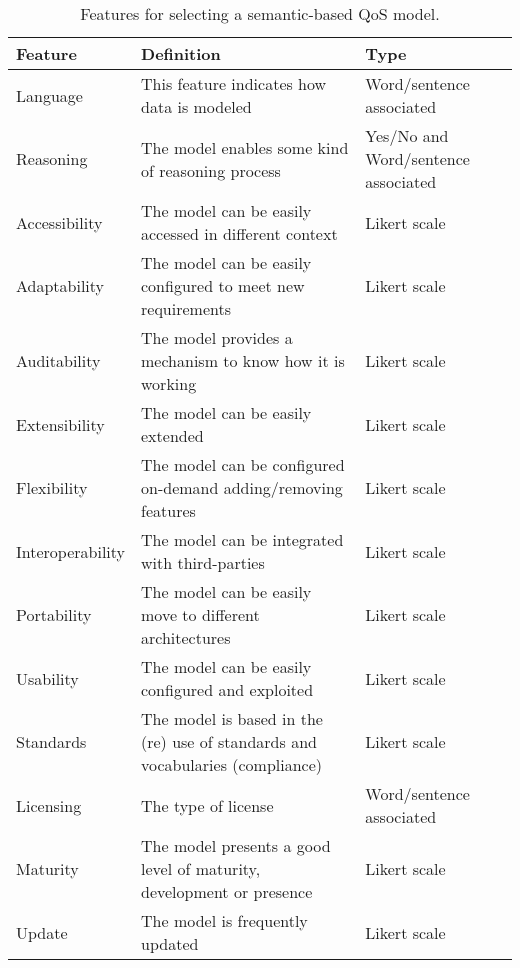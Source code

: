 \begin{table}[!ht]
\renewcommand{\arraystretch}{1.3}
\tiny
\begin{center}
\begin{tabular}[c]{|p{2.5cm}|p{5cm}|p{3cm}|} 
\hline
  \textbf{Feature} &  \textbf{Definition}  &  \textbf{Type} \\\hline
  Language & This feature indicates how data is modeled & Word/sentence associated \\ \hline
  Reasoning & The model enables some kind of reasoning process & Yes/No and Word/sentence associated  \\ \hline
  Accessibility & The model can be easily accessed in different context & Likert scale  \\ \hline
  Adaptability & The model can be easily configured to meet new requirements & Likert scale  \\ \hline
  Auditability & The model provides a mechanism to know how it is working & Likert scale  \\ \hline
  Extensibility & The model can be easily extended & Likert scale  \\ \hline
  Flexibility & The model can be configured on-demand adding/removing features & Likert scale  \\ \hline  
  Interoperability & The model can be integrated with third-parties  & Likert scale  \\ \hline
  Portability & The model can be easily move to different architectures & Likert scale  \\ \hline
  Usability & The model can be easily configured and exploited & Likert scale  \\ \hline
  Standards & The model is based in the (re) use of standards and vocabularies (compliance) & Likert scale\ \\ \hline
  Licensing & The type of license & Word/sentence associated \\ \hline
  Maturity & The model presents a good level of maturity, development or presence & Likert scale\\ \hline
  Update & The model is frequently updated & Likert scale\\ \hline
\hline
\end{tabular}
\caption{Features for selecting a semantic-based QoS model.}\label{features-qos-models}
  \end{center}
\end{table} 


